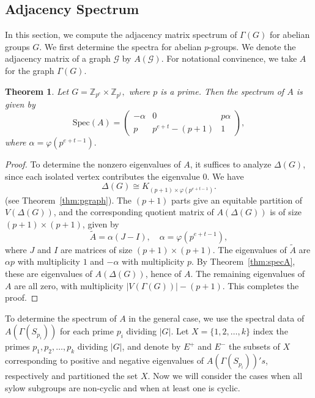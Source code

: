 \documentclass[11pt]{article}
\def \Z {{\mathbb Z}}
\def \G {{\mathcal G}}
\newtheorem{theorem}{Theorem}[section]
\begin{document}
\subsection{Adjacency Spectrum}
 In this section, we compute the adjacency matrix spectrum of $\Gamma(G)$ for abelian groups $G$. We first determine the spectra for abelian $p$-groups. We denote the adjacency matrix of a graph $\G$ by $A(\G)$. For notational convinence, we take $A$ for the graph $\Gamma(G).$
 \begin{theorem}\label{thm:padjc}
            Let $G=\Z_{p^e}\times  \Z_{p^t},$ where $p$ is a prime. Then the spectrum of $A$ is given by
            $$\mathrm{Spec}(A)=\begin{pmatrix}-\alpha&0&p\alpha\\ p&p^{e+t}-(p+1)&1\end{pmatrix},$$  where $\alpha=\varphi(p^{e+t-1}).$ 
        \end{theorem}
        \begin{proof}
            To determine the nonzero eigenvalues of $A$, it suffices to analyze 
            $\Delta(G)$, since each isolated vertex contributes the eigenvalue $0$. 
    We have 
            \[
            \Delta(G) \cong K_{(p+1)\times \varphi(p^{e+t-1})}.
            \] (see Theorem~\ref{thm:pgraph}).
            The $(p+1)$ parts give an equitable partition of $V(\Delta(G))$, and 
            the corresponding quotient matrix of $A(\Delta(G))$ is of size
            $(p+1)\times(p+1)$, given by 
            $$
            \widetilde{A} = \alpha(J - I), \quad \alpha = \varphi(p^{e+t-1}),
            $$
            where $J$ and $I$ are matrices of size
     $(p+1)\times (p+1)$. The eigenvalues of $\widetilde{A}$ are $\alpha p$ with 
            multiplicity $1$ and $-\alpha$ with multiplicity $p$. By 
            Theorem~\ref{thm:specA}, these are eigenvalues of $A(\Delta(G))$, 
            hence of $A$. The remaining eigenvalues of $A$ are all zero, with 
            multiplicity $|V(\Gamma(G))| - (p+1)$. This completes the proof.
        \end{proof}
            To determine the spectrum of $A$ in the general case, we use the 
            spectral data of $A(\Gamma(S_{p_i}))$ for each prime $p_i$ dividing $|G|$. 
            Let $X = \{1, 2, \ldots, k\}$ index the primes $p_1, p_2, \ldots, p_k$ 
            dividing $|G|$, and denote by $E^{+}$ and $E^{-}$ the subsets of $X$ 
            corresponding to positive and negative eigenvalues of $A(\Gamma(S_{p_i}))'s$, 
            respectively and partitioned the set $X$. Now we will consider the cases when all sylow subgroups are non-cyclic and when at least one is cyclic.
\end{document}
